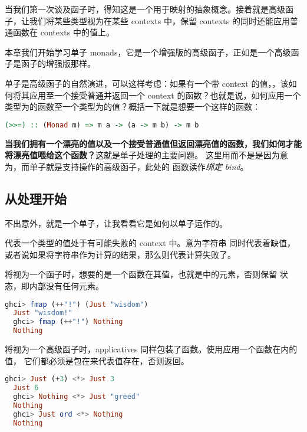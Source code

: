 \documentclass[./main.tex]{subfiles}
\begin{document}
当我们第一次谈及函子时，得知这是一个用于映射的抽象概念。接着就是高级函子，让我们将某些类型视为在某些 contexts 中，保留 contexts
的同时还能应用普通函数在 contexts 中的值上。

本章我们开始学习单子 monads，它是一个增强版的高级函子，正如是一个高级函子是函子的增强版那样。

单子是高级函子的自然演进，可以这样考虑：如果有一个带 context 的值，，该如何将其应用至一个接受普通并返回一个
context 的函数？也就是说，如何应用一个类型为的函数至一个类型为的值？概括一下就是想要一个这样的函数：

\begin{lstlisting}[language=Haskell]
  (>>=) :: (Monad m) => m a -> (a -> m b) -> m b
\end{lstlisting}

\textbf{当我们拥有一个漂亮的值以及一个接受普通值但返回漂亮值的函数，我们如何才能将漂亮值喂给这个函数？}这就是单子处理的主要问题。
这里用而不是是因为意为，而单子就是支持\acode{>>=}操作的高级函子，此处的
\acode{>>=}函数读作\textit{绑定 bind}。

\subsection*{从处理开始}

不出意外，就是一个单子，让我看看它是如何以单子运作的。

代表一个类型的值处于有可能失败的 context 中。意为字符串
同时代表着缺值，或者说如果将字符串作为计算的结果，那么则代表计算失败了。

将视为一个函子时，想要的是一个函数在其值，也就是中的元素，否则保留
状态，即内部没有任何元素。

\begin{lstlisting}[language=Haskell]
  ghci> fmap (++"!") (Just "wisdom")
  Just "wisdom!"
  ghci> fmap (++"!") Nothing
  Nothing
\end{lstlisting}

将视为一个高级函子时，applicatives 同样包装了函数。使用\acode{<*>}应用一个函数在内的值，
它们都必须是包在来代表值存在，否则返回。

\begin{lstlisting}[language=Haskell]
  ghci> Just (+3) <*> Just 3
  Just 6
  ghci> Nothing <*> Just "greed"
  Nothing
  ghci> Just ord <*> Nothing
  Nothing
\end{lstlisting}
\end{document}
